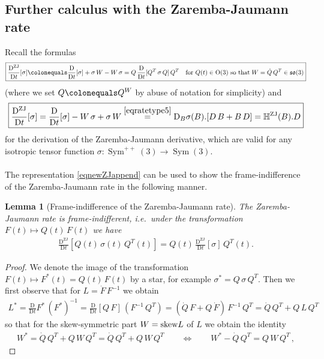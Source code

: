 \documentclass[10pt]{article}
\newcounter{theoremCounter}
\numberwithin{theoremCounter}{section}
\theoremstyle{plain}
\newtheorem{lem}[theoremCounter]{Lemma}
\theoremstyle{definition}
\newcommand{\OO}{{\rm O}}
\newcommand{\DD}{\mathrm{D}}
\DeclareMathOperator{\Sym}{Sym}
\DeclareMathOperator{\ZJ}{ZJ}
\def\sk{\textnormal{skew}}
\def\H{\mathbb{H}}
\numberwithin{equation}{section}
\begin{document}
\begin{appendix}
\subsection{Further calculus with the Zaremba-Jaumann rate}
%
Recall the formulas 
	\begin{align}
	\label{ZJrate01A}
	\boxed{\frac{\DD^{\ZJ}}{\DD t}[\sigma] \colonequals \frac{\DD}{\DD t}[\sigma] + \sigma \, W - W \, \sigma = Q \, \frac{\DD}{\DD t}[Q^T \, \sigma \, Q] \, Q^T  \quad \textnormal{for $Q(t) \in \OO(3)$ so that} \;  W =\dot{Q} \, Q^T\in \mathfrak{so}(3)}
	\end{align}
(where we set $Q\colonequals Q^W$ by abuse of notation for simplicity) and
	\begin{align}
	\label{eqnewZJappend}
	\boxed{\frac{\DD^{\ZJ}}{\DD t}[\sigma] = \frac{\DD}{\DD t}[\sigma] - W \, \sigma + \sigma \, W \overset{\eqref{eqratetype5}}{=} \DD_B\sigma(B).[D \, B + B \, D] = \H^{\ZJ}(B).D}
	\end{align}
for the derivation of the Zaremba-Jaumann derivative, which are valid for any isotropic tensor function \break $\sigma\colon \Sym^{++}(3) \to \Sym(3)$. \\
\\
The representation \eqref{eqnewZJappend} can be used to show the frame-indifference of the Zaremba-Jaumann rate in the following manner.
%
\begin{lem}[Frame-indifference of the Zaremba-Jaumann rate] \label{frameindZJ}
The Zaremba-Jaumann rate is frame-indifferent, i.e.~under the transformation $F(t) \mapsto Q(t) \, F(t)$ we have
	\begin{align}
	\label{eqframeindif2}
	\frac{\DD^{\ZJ}}{\DD t}[Q(t) \, \sigma(t) \, Q^T(t)] = Q(t) \, \frac{\DD^{\ZJ}}{\DD t} [\sigma] \, Q^T(t).
	\end{align}
\end{lem}
%
\begin{proof}
We denote the image of the transformation $F(t) \mapsto F^*(t) = Q(t) \, F(t)$ by a star, for example $\sigma^* = Q \, \sigma \, Q^T$. Then we first observe that for $L = \dot F \, F^{-1}$ we obtain
	\begin{align}
	L^* = \frac{\DD}{\DD t} F^* \, (F^*)^{-1} = \frac{\DD}{\DD t}[Q \, F] \, (F^{-1} \, Q^T) = (\dot Q \, F + Q \, \dot F) \, F^{-1} \, Q^T = \dot Q \, Q^T + Q \, L \, Q^T
	\end{align}
so that for the skew-symmetric part $W = \sk L$ of $L$ we obtain the identity 
	\begin{align}
	\label{identforw}
	W^* = \dot Q \, Q^T + Q \, W \, Q^T = \dot Q \, Q^T + Q \, W \, Q^T \qquad \iff \qquad W^* - \dot Q \, Q^T = Q \, W \, Q^T \, ,

\end{align}
\end{proof}
\end{appendix}
\end{document}
